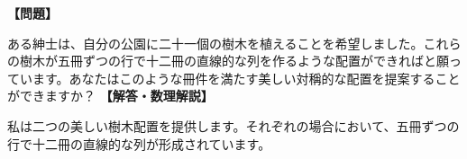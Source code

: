 \documentclass[10pt,a4paper,oneside,openany]{ltjsbook}
\begin{document}
\begin{tcolorbox}[colback=softblue,colframe=primaryblue,title=\textbf{第 209 問：二十一個の樹木 （原題: THE TWENTY-ONE TREES.）},arc=2mm,boxrule=1pt,breakable]
\textbf{【問題】}\par\vspace{0.3em}
ある紳士は、自分の公園に二十一個の樹木を植えることを希望しました。これらの樹木が五冊ずつの行で十二冊の直線的な列を作るような配置ができればと願っています。あなたはこのような冊件を満たす美しい対稱的な配置を提案することができますか？
\tcblower
\textbf{【解答・数理解説】}\par\vspace{0.3em}
私は二つの美しい樹木配置を提供します。それぞれの場合において、五冊ずつの行で十二冊の直線的な列が形成されています。
\end{tcolorbox}
\end{document}
